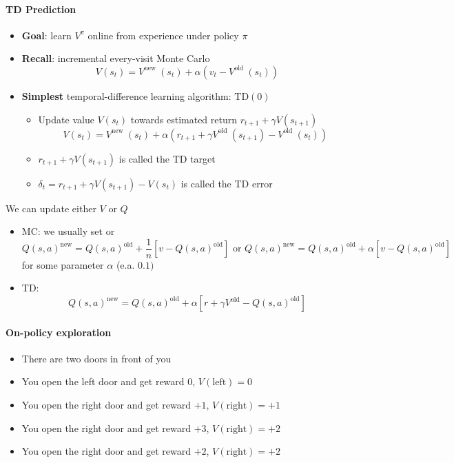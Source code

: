 \paragraph{TD Prediction}
\begin{itemize}
    \item \textbf{Goal}: learn $V^{\pi}$ online from experience under policy $\pi$
    \item \textbf{Recall}: incremental every-visit Monte Carlo
    \[
    V\left(s_{t}\right)=V^{\text {new }}\left(s_{t}\right)+\alpha\left(v_{t}-V^{\text {old }}\left(s_{t}\right)\right)
    \]
    \item \textbf{Simplest} temporal-difference learning algorithm: $\mathrm{TD}(0)$
    \begin{itemize}
        \item Update value $V\left(s_{t}\right)$ towards estimated return $r_{t+1}+\gamma V\left(s_{t+1}\right)$
        \[
        V\left(s_{t}\right)=V^{\text {new }}\left(s_{t}\right)+\alpha\left(r_{t+1}+\gamma V^{\text {old }}\left(s_{t+1}\right)-V^{\text {old }}\left(s_{t}\right)\right)
        \]
        \item $r_{t+1}+\gamma V\left(s_{t+1}\right)$ is called the TD target
        \item $\delta_{t}=r_{t+1}+\gamma V\left(s_{t+1}\right)-V\left(s_{t}\right)$ is called the TD error
    \end{itemize}
\end{itemize}

We can update either $V$ or $Q$

\begin{itemize}
    \item MC: we usually set
    or
    \[
    Q(s, a)^{\text{new}}=Q(s, a)^{\text{old}}+\frac{1}{n}\left[v-Q(s, a)^{\text{old}}\right] \text{ or } Q(s, a)^{\text{new}}=Q(s, a)^{\text{old}}+\alpha\left[v-Q(s, a)^{\text{old}}\right]
    \]
    for some parameter $\alpha$ (e.a. $0.1)$
    \item TD:
\[
Q(s, a)^{\text{new}}=Q(s, a)^{\text{old}}+\alpha\left[r+\gamma V^{\text{old}}-Q(s, a)^{\text{old}}\right]
\]
\end{itemize}

\paragraph{On-policy exploration}
\begin{itemize}
    \item There are two doors in front of you
    \item You open the left door and get reward 0, $V(\text{left})=0$
    \item You open the right door and get reward $+1$, $V(\text{right})=+1$
    \item You open the right door and get reward $+3$, $V(\text{right})=+2$
    \item You open the right door and get reward $+2$, $V(\text{right})=+2$
\end{itemize}

